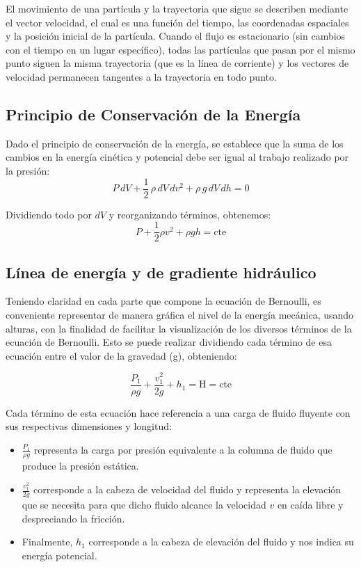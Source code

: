 \documentclass[10pt, oneside]{article}
\begin{document}
El movimiento de una partícula y la trayectoria que sigue se describen mediante el vector velocidad, el cual es una función del tiempo, las coordenadas espaciales y la posición inicial de la partícula. Cuando el flujo es estacionario (sin cambios con el tiempo en un lugar específico), todas las partículas que pasan por el mismo punto siguen la misma trayectoria (que es la línea de corriente) y los vectores de velocidad permanecen tangentes a la trayectoria en todo punto.
 
\subsection*{Principio de Conservación de la Energía}
Dado el principio de conservación de la energía, se establece que la suma de los cambios en la energía cinética y potencial debe ser igual al trabajo realizado por la presión:
$$ 
P \, dV + \frac{1}{2} \, \rho \, dV \, dv^2 + \rho \, g \, dV \, dh = 0
$$

Dividiendo todo por \(dV\) y reorganizando términos, obtenemos:
$$
P + \frac{1}{2} \rho v^2 + \rho g h = \text{cte}
$$

\subsection{Línea de energía y de gradiente hidráulico}
Teniendo claridad en cada parte que compone la ecuación de Bernoulli, es conveniente representar de manera gráfica el nivel de la energía mecánica, usando alturas, con la finalidad de facilitar la visualización de los diversos términos de la ecuación de Bernoulli. Esto se puede realizar dividiendo
cada término de esa ecuación entre el valor de la gravedad (g), obteniendo:

\begin{equation}
\frac{P_1}{\rho g} + \frac{v_1^2}{2g} + h_1 = \text{H} = \text{cte}
\label{ace}
\end{equation}

Cada término de esta ecuación hace referencia a una carga de fluido fluyente con sus respectivas dimensiones y longitud:

\begin{itemize}
    \item $\frac{P_1}{\rho g}$ representa la carga por presión equivalente a la columna de fluido que produce la presión estática.
    \item $\frac{v_1^2}{2g}$ corresponde a la cabeza de velocidad del fluido y representa la elevación que se necesita para que dicho fluido alcance la velocidad \(v\) en caída libre y despreciando la fricción.
    \item Finalmente, $h_1$ corresponde a la cabeza de elevación del fluido y nos indica su energía potencial.
\end{itemize}
\end{document}
